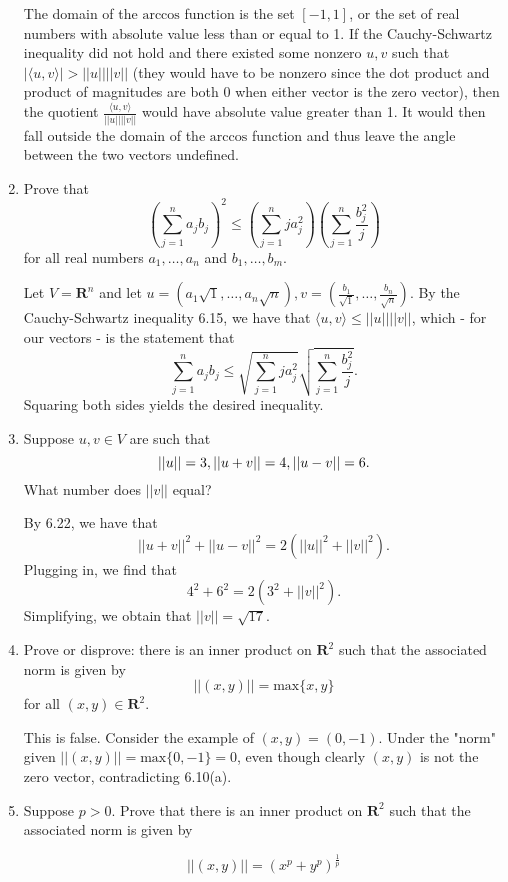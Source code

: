 \documentclass{book}
\begin{document}
\begin{enumerate}
The domain of the \(\textrm{arccos}\) function is the set \([-1,1]\), or the set of real numbers with absolute value less than or equal to 1.  If the Cauchy-Schwartz inequality did not hold and there existed some nonzero \(u,v\) such that \(|\langle u,v \rangle| > ||u||||v||\) (they would have to be nonzero since the dot product and product of magnitudes are both 0 when either vector is the zero vector), then the quotient \(\frac{\langle u,v \rangle}{||u||||v||}\) would have absolute value greater than 1.  It would then fall outside the domain of the \(\textrm{arccos}\) function and thus leave the angle between the two vectors undefined.

\item Prove that \[(\sum_{j=1}^{n} a_jb_j)^2 \leq (\sum_{j=1}^{n} ja_j^2)(\sum_{j=1}^{n} \frac{b_j^2}{j})\] for all real numbers \(a_1,\dots,a_n\) and \(b_1,\dots,b_m\).

Let \(V=\textbf{R}^n\) and let \(u=(a_1\sqrt{1},\dots,a_n\sqrt{n}),v=(\frac{b_1}{\sqrt{1}},\dots,\frac{b_n}{\sqrt{n}})\).  By the Cauchy-Schwartz inequality 6.15, we have that \(\langle u,v \rangle \leq ||u||||v||\), which - for our vectors - is the statement that \[\sum_{j=1}^{n} a_jb_j \leq \sqrt{\sum_{j=1}^{n} ja_j^2}\sqrt{\sum_{j=1}^{n} \frac{b_j^2}{j}}.\] Squaring both sides yields the desired inequality.

\item Suppose \(u,v \in V\) are such that \[||u||=3, \\ ||u+v||=4, \\ ||u-v||=6.\] What number does \(||v||\) equal?

By 6.22, we have that \[||u+v||^2+||u-v||^2=2(||u||^2+||v||^2).\] Plugging in, we find that \[4^2+6^2=2(3^2+||v||^2).\] Simplifying, we obtain that \(||v||=\sqrt{17}\).

\item Prove or disprove: there is an inner product on \(\textbf{R}^2\) such that the associated norm is given by \[||(x,y)||=\textrm{max}\{x,y\}\] for all \((x,y) \in \textbf{R}^2\).

This is false.  Consider the example of \((x,y)=(0,-1)\).  Under the "norm" given \(||(x,y)||=\textrm{max}\{0,-1\}=0\), even though clearly \((x,y)\) is not the zero vector, contradicting 6.10(a).

\item Suppose \(p>0\).  Prove that there is an inner product on \(\textbf{R}^2\) such that the associated norm is given by

\begin{equation*}
    ||(x,y)|| = (x^p+y^p)^{\frac{1}{p}}
\end{equation*}


\end{enumerate}
\end{document}
